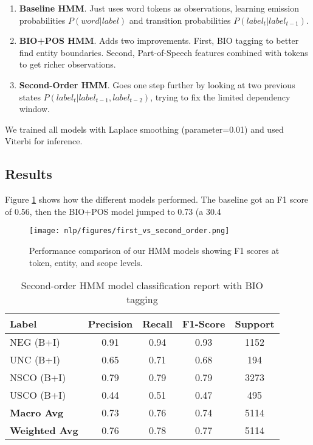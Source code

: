 \documentclass[9pt,a4paper,twoside]{tau-class/tau}
\begin{document}
        \begin{enumerate}
            \item \textbf{Baseline HMM}. Just uses word tokens as observations, learning emission probabilities $P(word|label)$ and transition probabilities $P(label_t|label_{t-1})$.
            
            \item \textbf{BIO+POS HMM}. Adds two improvements. First, BIO tagging to better find entity boundaries. Second, Part-of-Speech features combined with tokens to get richer observations.
            
            \item \textbf{Second-Order HMM}. Goes one step further by looking at two previous states $P(label_t|label_{t-1},label_{t-2})$, trying to fix the limited dependency window.
        \end{enumerate}
        
        We trained all models with Laplace smoothing (parameter=0.01) and used Viterbi for inference.
    \subsection{Results}
        Figure \ref{fig:hmm-comparison} shows how the different models performed. The baseline got an F1 score of 0.56, then the BIO+POS model jumped to 0.73 (a 30.4%
        
        \begin{figure}[H]
            \centering
            \texttt{[image: nlp/figures/first\_vs\_second\_order.png]}
            \caption{Performance comparison of our HMM models showing F1 scores at token, entity, and scope levels.}
            \label{fig:hmm-comparison}
        \end{figure}
        
        \begin{table}[h]
        \centering
        \caption{Second-order HMM model classification report with BIO tagging}
        \begin{tabular}{|l|c|c|c|c|}
        \hline
        \textbf{Label} & \textbf{Precision} & \textbf{Recall} & \textbf{F1-Score} & \textbf{Support} \\
        \hline
        NEG (B+I)   & 0.91 & 0.94 & 0.93 & 1152 \\
        UNC (B+I)   & 0.65 & 0.71 & 0.68 & 194  \\
        NSCO (B+I)  & 0.79 & 0.79 & 0.79 & 3273 \\
        USCO (B+I)  & 0.44 & 0.51 & 0.47 & 495  \\
        \hline
        \textbf{Macro Avg}    & 0.73 & 0.76 & 0.74 & 5114 \\
        \textbf{Weighted Avg} & 0.76 & 0.78 & 0.77 & 5114 \\
        \hline
        \end{tabular}
        \end{table}
        
\end{document}

